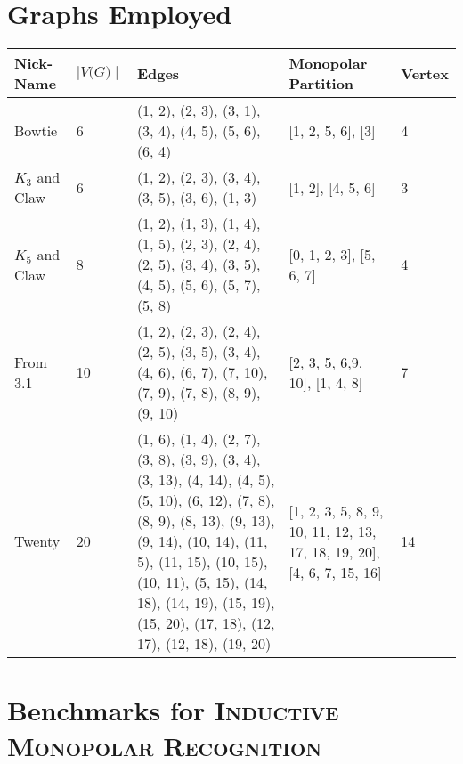 \documentclass[11pt]{article}
\begin{document}

\section{Graphs Employed}
\label{subsec:graphs}

\begin{center}
    \begin{tabu} to 0.8\textwidth { | X[l] X[c] X[c] X[c] X[c] | }
        \hline
        Nick-Name & $\mid\textit{V(G)}\mid$ & Edges & Monopolar Partition & Vertex \\
        [0.5ex]
        \hline
        \hline
        Bowtie & 6 & (1, 2), (2, 3), (3, 1), (3, 4), (4, 5), (5, 6), (6, 4) & [1, 2, 5, 6], [3] & 4 \\
        [0.3ex]
        \hline
        $K_3$ and Claw & 6 & (1, 2), (2, 3), (3, 4), (3, 5), (3, 6), (1, 3) & [1, 2], [4, 5, 6] & 3 \\
        [0.3ex]
        \hline
        $K_5$ and Claw & 8 & (1, 2), (1, 3), (1, 4), (1, 5), (2, 3), (2, 4), (2, 5), (3, 4), (3, 5), (4, 5), (5, 6), (5, 7), (5, 8) & [0, 1, 2, 3], [5, 6, 7] & 4 \\
        [0.3ex]
        \hline
        From 3.1 & 10 & (1, 2), (2, 3), (2, 4), (2, 5), (3, 5), (3, 4), (4, 6), (6, 7), (7, 10), (7, 9), (7, 8), (8, 9), (9, 10) & [2, 3, 5, 6,9, 10], [1, 4, 8] & 7 \\
        [0.3ex]
        \hline
        Twenty & 20 & (1, 6), (1, 4), (2, 7), (3, 8), (3, 9), (3, 4), (3, 13), (4, 14), (4, 5), (5, 10), (6, 12), (7, 8), (8, 9), (8, 13), (9, 13), (9, 14), (10, 14), (11, 5), (11, 15), (10, 15), (10, 11), (5, 15), (14, 18), (14, 19), (15, 19), (15, 20), (17, 18), (12, 17), (12, 18), (19, 20) & [1, 2, 3, 5, 8, 9, 10, 11, 12, 13, 17, 18, 19, 20], [4, 6, 7, 15, 16] & 14 \\
        [0.3ex]
        \hline
    \end{tabu}
\end{center}

\section{Benchmarks for \textsc{Inductive Monopolar Recognition}}
\label{subsec:structural}
\end{document}
